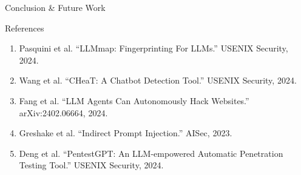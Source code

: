 \documentclass[final]{beamer}
\newlength{\sepwidth}
\newlength{\colwidth}
\newcommand{\separatorcolumn}{\begin{column}{\sepwidth}\end{column}}
\begin{document}
\begin{frame}[t]
\begin{columns}[t]
\begin{column}{\colwidth}
\begin{alertblock}{Conclusion \& Future Work}
  \end{alertblock}

  \begin{block}{References}

    \footnotesize
    \begin{enumerate}
      \item Pasquini et al. ``LLMmap: Fingerprinting For LLMs.'' USENIX Security, 2024.
      \item Wang et al. ``CHeaT: A Chatbot Detection Tool.'' USENIX Security, 2024.
      \item Fang et al. ``LLM Agents Can Autonomously Hack Websites.'' arXiv:2402.06664, 2024.
      \item Greshake et al. ``Indirect Prompt Injection.'' AISec, 2023.
      \item Deng et al. ``PentestGPT: An LLM-empowered Automatic Penetration Testing Tool.'' USENIX Security, 2024.
    \end{enumerate}

  \end{block}

\end{column}

\separatorcolumn
\end{columns}
\end{frame}
\end{document}
